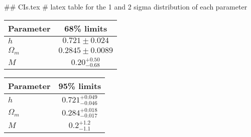 ## CIs.tex
# latex table for the 1 and 2 sigma distribution of each parameter

\begin{tabular} { l  c}
 Parameter &  68\% limits\\
\hline
{\boldmath$h              $} & $0.721\pm 0.024            $\\
{\boldmath$\Omega_m       $} & $0.2845\pm 0.0089          $\\
{\boldmath$M              $} & $0.20^{+0.50}_{-0.68}      $\\
\hline
\end{tabular}

\begin{tabular} { l  c}
 Parameter &  95\% limits\\
\hline
{\boldmath$h              $} & $0.721^{+0.049}_{-0.046}   $\\
{\boldmath$\Omega_m       $} & $0.284^{+0.018}_{-0.017}   $\\
{\boldmath$M              $} & $0.2^{+1.2}_{-1.1}         $\\
\hline
\end{tabular}
